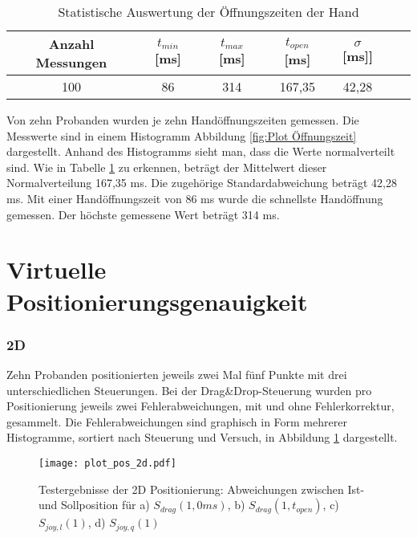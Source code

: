 \begin{table}[htb]
	\caption{Statistische Auswertung der Öffnungszeiten der Hand}
	\label{table oeffnungszeit}
	\begin{center}
		\begin{tabular}{|c|c|c|c|c|c|c|}
			\hline 
			Anzahl Messungen & $t_{min}$ [ms] & $t_{max}$ [ms] & ${t}_{open}$ [ms] & $\sigma$ [ms]] \\ 
			\hline 
			100 & 86 & 314 & 167,35 & 42,28 \\ 
			\hline 
		\end{tabular} 
	\end{center}
\end{table}



Von zehn Probanden wurden je zehn Handöffnungszeiten gemessen. Die Messwerte sind in einem Histogramm Abbildung \ref{fig:Plot Öffnungszeit} dargestellt. Anhand des Histogramms sieht man, dass die Werte normalverteilt sind. Wie in Tabelle \ref{table oeffnungszeit} zu erkennen, beträgt der Mittelwert dieser Normalverteilung 167,35 ms. Die zugehörige Standardabweichung beträgt 42,28 ms. Mit einer Handöffnungszeit von 86 ms wurde die schnellste Handöffnung gemessen. Der höchste gemessene Wert beträgt 314 ms.

\section{Virtuelle Positionierungsgenauigkeit}

\subsubsection{2D}
Zehn Probanden positionierten jeweils zwei Mal fünf Punkte mit drei unterschiedlichen Steuerungen. Bei der Drag\&Drop-Steuerung wurden pro Positionierung jeweils zwei Fehlerabweichungen, mit und ohne Fehlerkorrektur, gesammelt.
Die Fehlerabweichungen sind graphisch in Form mehrerer Histogramme, sortiert nach Steuerung und Versuch, in Abbildung \ref{fig:Plot Positionierung 2D} dargestellt.

\begin{figure}[h]
	\centering
	\texttt{[image: plot\_pos\_2d.pdf]}
	\caption[Testergebnisse der 2D Positionierung]{Testergebnisse der 2D Positionierung: Abweichungen zwischen Ist- und Sollposition für a) $S_{drag}(1,0ms)$, b) $S_{drag}(1,t_{open})$, c) $S_{joy,l}(1)$, d) $S_{joy,q}(1)$}
	\label{fig:Plot Positionierung 2D}
\end{figure}

